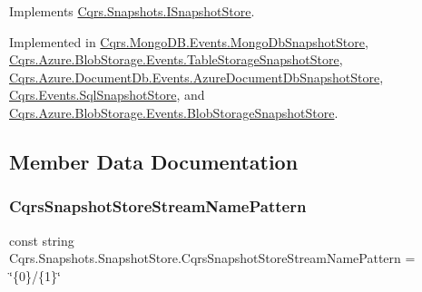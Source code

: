 Implements \hyperlink{interfaceCqrs_1_1Snapshots_1_1ISnapshotStore_a6e99c620115ce8a0648a83bf2ce05527_a6e99c620115ce8a0648a83bf2ce05527}{Cqrs.\+Snapshots.\+I\+Snapshot\+Store}.



Implemented in \hyperlink{classCqrs_1_1MongoDB_1_1Events_1_1MongoDbSnapshotStore_abd129099f8ed40c140ad2b39e730035a_abd129099f8ed40c140ad2b39e730035a}{Cqrs.\+Mongo\+D\+B.\+Events.\+Mongo\+Db\+Snapshot\+Store}, \hyperlink{classCqrs_1_1Azure_1_1BlobStorage_1_1Events_1_1TableStorageSnapshotStore_a25ec7d179773aec79febdf0e8873b285_a25ec7d179773aec79febdf0e8873b285}{Cqrs.\+Azure.\+Blob\+Storage.\+Events.\+Table\+Storage\+Snapshot\+Store}, \hyperlink{classCqrs_1_1Azure_1_1DocumentDb_1_1Events_1_1AzureDocumentDbSnapshotStore_a52dd38e57e884db7529c8f57c3da7479_a52dd38e57e884db7529c8f57c3da7479}{Cqrs.\+Azure.\+Document\+Db.\+Events.\+Azure\+Document\+Db\+Snapshot\+Store}, \hyperlink{classCqrs_1_1Events_1_1SqlSnapshotStore_ae219c88f6d56fbceef7c738dae824666_ae219c88f6d56fbceef7c738dae824666}{Cqrs.\+Events.\+Sql\+Snapshot\+Store}, and \hyperlink{classCqrs_1_1Azure_1_1BlobStorage_1_1Events_1_1BlobStorageSnapshotStore_afb32196428d4c92c9542a94a1764fa59_afb32196428d4c92c9542a94a1764fa59}{Cqrs.\+Azure.\+Blob\+Storage.\+Events.\+Blob\+Storage\+Snapshot\+Store}.



\subsection{Member Data Documentation}
\mbox{\label{classCqrs_1_1Snapshots_1_1SnapshotStore_a8113b186bf4a563b916d19c8d6d9cd0f_a8113b186bf4a563b916d19c8d6d9cd0f}} 
\subsubsection{\texorpdfstring{Cqrs\+Snapshot\+Store\+Stream\+Name\+Pattern}{CqrsSnapshotStoreStreamNamePattern}}
{\footnotesize\ttfamily const string Cqrs.\+Snapshots.\+Snapshot\+Store.\+Cqrs\+Snapshot\+Store\+Stream\+Name\+Pattern = \char`\"{}\{0\}/\{1\}\char`\"{}\hspace{0.3cm}{\ttfamily [protected]}}



